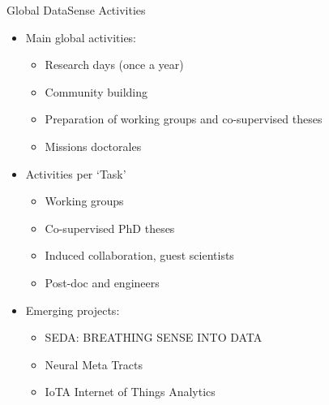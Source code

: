\begin{frame}{Global DataSense Activities}

  \begin{itemize}
  \item Main global activities:
    \begin{itemize}
    \item Research days (once a year)
    \item Community building
    \item Preparation of working groups and co-supervised theses
    \item Missions doctorales
    \end{itemize}

  \item Activities per `Task'
    \begin{itemize}
    \item Working groups
    \item Co-supervised PhD theses
    \item Induced collaboration, guest scientists
    \item Post-doc and engineers
    \end{itemize}

  \item Emerging projects: 
    \begin{itemize}
    \item SEDA: BREATHING SENSE INTO DATA
    \item Neural Meta Tracts
    \item IoTA Internet of Things Analytics
    \end{itemize}
  \end{itemize}

\end{frame}

